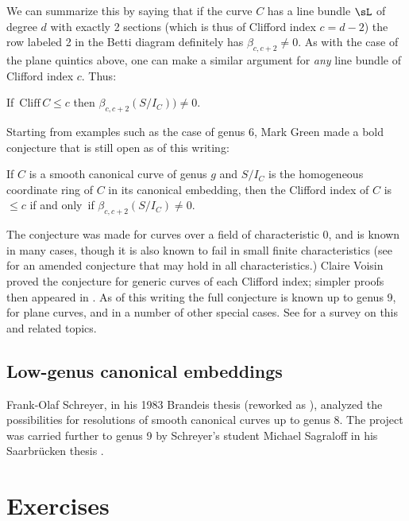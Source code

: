 We can summarize this by saying
that if the curve $C$ has a line bundle $\sL$ of degree $d$ with exactly
2 sections (which is thus of Clifford index $c = d-2$) the row labeled  2
in the Betti diagram definitely has $\beta_{c, c+2} \neq 0$. As with
the case of the plane quintics above, one can
make a similar argument for \emph{any} line bundle of Clifford index
$c$. Thus:

\begin{corollary}
If\, $\mathrm{Cliff}\, C \leq c$ then $\beta_{c,c+2}(S/I_C)) \neq 0$.
\unif
\end{corollary}

Starting from examples such as the case of genus 6, Mark Green made a
%
bold conjecture that is still open as of this writing:

\begin{conjecture}
If $C$ is a smooth canonical curve of genus $g$ and $S/I_C$ is the
%
homogeneous coordinate ring of $C$ in its canonical embedding,
then the Clifford index of $C$ is $\leq c$ if and only~if
$\beta_{c,c+2}(S/I_C) \neq 0$.
\unif
\end{conjecture}

The conjecture was made for curves over a field of characteristic 0, and
is known in many cases, though it is also known to fail in small finite
characteristics (see \cite{Bopp-Schreyer} for an amended conjecture that
may hold in all characteristics.)
Claire Voisin
\citeyear{MR1941089,MR2157134} 
%
proved
the conjecture 
for generic curves of each Clifford index; 
simpler proofs then appeared in
\cite{MR4022070,MR4213770,arXiv:2205.00266}.
As of this writing the full conjecture is known up to genus 9,  for
plane curves, and in a number of other special cases.
See 
\cite{Farkas-progress-on-syzygies} for a survey on this
and related topics.

\subsection*{Low-genus canonical embeddings}
Frank-Olaf
Schreyer, in his 1983 Brandeis
thesis 
(reworked as \cite{Schreyer-canonical}),
analyzed the possibilities for reso\-lutions of smooth
canonical curves up to genus 8. The project was carried further to
genus 9 by Schreyer's student
Michael Sagraloff 
in his Saarbr\"ucken thesis \citeyear{Sagraloff}.


\section{Exercises}

